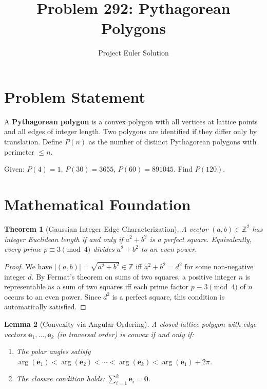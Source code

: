 \documentclass[12pt]{article}
\title{Problem 292: Pythagorean Polygons}
\author{Project Euler Solution}
\date{}
\newtheorem{theorem}{Theorem}
\newtheorem{lemma}[theorem]{Lemma}
\begin{document}
\maketitle

\section{Problem Statement}
A \textbf{Pythagorean polygon} is a convex polygon with all vertices at lattice points and all edges of integer length. Two polygons are identified if they differ only by translation. Define $P(n)$ as the number of distinct Pythagorean polygons with perimeter $\leq n$.

Given: $P(4) = 1$, $P(30) = 3655$, $P(60) = 891045$. Find $P(120)$.

\section{Mathematical Foundation}

\begin{theorem}[Gaussian Integer Edge Characterization]
A vector $(a, b) \in \mathbb{Z}^2$ has integer Euclidean length if and only if $a^2 + b^2$ is a perfect square. Equivalently, every prime $p \equiv 3 \pmod{4}$ divides $a^2 + b^2$ to an even power.
\end{theorem}

\begin{proof}
We have $|(a,b)| = \sqrt{a^2 + b^2} \in \mathbb{Z}$ iff $a^2 + b^2 = d^2$ for some non-negative integer $d$. By Fermat's theorem on sums of two squares, a positive integer $n$ is representable as a sum of two squares iff each prime factor $p \equiv 3 \pmod{4}$ of $n$ occurs to an even power. Since $d^2$ is a perfect square, this condition is automatically satisfied.
\end{proof}

\begin{lemma}[Convexity via Angular Ordering]
A closed lattice polygon with edge vectors $\mathbf{e}_1, \ldots, \mathbf{e}_k$ (in traversal order) is convex if and only if:
\begin{enumerate}
\item The polar angles satisfy $\arg(\mathbf{e}_1) < \arg(\mathbf{e}_2) < \cdots < \arg(\mathbf{e}_k) < \arg(\mathbf{e}_1) + 2\pi$.
\item The closure condition holds: $\sum_{i=1}^k \mathbf{e}_i = \mathbf{0}$.
\end{enumerate}
\end{lemma}
\end{document}
